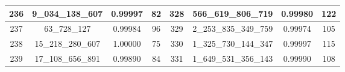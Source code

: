 \documentclass[letterpaper]{article}
\begin{document}
{\begin{tabular}{|c c c c| c c c c|}
        \hline
        236             & 9\_034\_138\_607  & 0.99997          & 82              & 328          & 566\_619\_806\_719    & 0.99980          & 122             \\
        \hline
        237             & 63\_728\_127      & 0.99984          & 96              & 329          & 2\_253\_835\_349\_759 & 0.99974          & 105             \\
        \hline
        238             & 15\_218\_280\_607 & 1.00000          & 75              & 330          & 1\_325\_730\_144\_347 & 0.99997          & 115             \\
        \hline
        239             & 17\_108\_656\_891 & 0.99890          & 84              & 331          & 1\_649\_531\_356\_143 & 0.99990          & 108             \\
        \hline
    \end{tabular}
}
\end{document}
